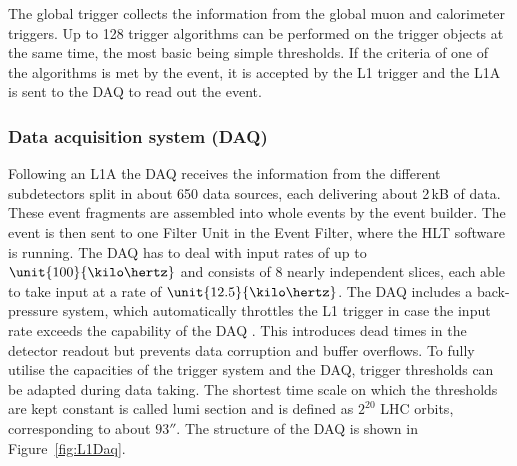 The global trigger collects the information from the global muon and calorimeter triggers. Up to 128 trigger algorithms can be performed on the trigger objects at the same time, the most basic being simple \pt thresholds. If the criteria of one of the algorithms is met by the event, it is accepted by the L1 trigger and the L1A is sent to the DAQ to read out the event.  


\subsubsection*{Data acquisition system (DAQ)}
Following an L1A the DAQ receives the information from the different subdetectors split in about 650 data sources, each delivering about 2\,kB of data. These event fragments are assembled into whole events by the event builder. The event is then sent to one Filter Unit in the Event Filter, where the HLT software is running. The DAQ has to deal with input rates of up to $\unit{100}{\kilo\hertz}$ and consists of 8 nearly independent slices, each able to take input at a rate of $\unit{12.5}{\kilo\hertz}$. The DAQ includes a back-pressure system, which automatically throttles the L1 trigger in case the input rate exceeds the capability of the DAQ . This introduces dead times in the detector readout but prevents data corruption and buffer overflows. To fully utilise the capacities of the trigger system and the DAQ, trigger thresholds can be adapted during data taking. The shortest time scale on which the thresholds are kept constant is called lumi section and is defined as $2^{20}$ LHC orbits, corresponding to about $\unit{93}{\second}$. The structure of the DAQ is shown in Figure~\ref{fig:L1Daq}.
